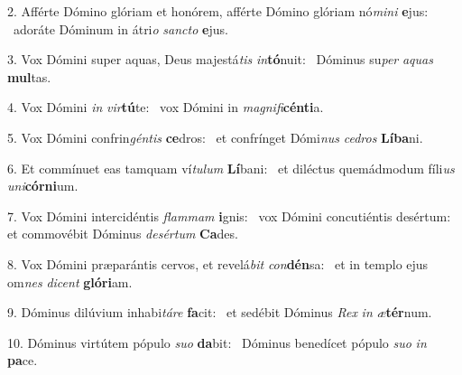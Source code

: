 2. Afférte Dómino glóriam et honórem, afférte Dómino glóriam nó\textit{mi}\textit{ni} \textbf{e}jus: \ast\  adoráte Dóminum in átri\textit{o} \textit{sanc}\textit{to} \textbf{e}jus.\

3. Vox Dómini super aquas, Deus majestá\textit{tis} \textit{in}\textbf{tó}nuit: \ast\  Dóminus su\textit{per} \textit{a}\textit{quas} \textbf{mul}tas.\

4. Vox Dómini \textit{in} \textit{vir}\textbf{tú}te: \ast\  vox Dómini in \textit{ma}\textit{gni}\textit{fi}\textbf{cén}\textbf{ti}a.\

5. Vox Dómini confrin\textit{gén}\textit{tis} \textbf{ce}dros: \ast\  et confrínget Dómi\textit{nus} \textit{ce}\textit{dros} \textbf{Lí}\textbf{ba}ni.\

6. Et commínuet eas tamquam ví\textit{tu}\textit{lum} \textbf{Lí}bani: \ast\  et diléctus quemádmodum fíli\textit{us} \textit{u}\textit{ni}\textbf{cór}\textbf{ni}um.\

7. Vox Dómini intercidéntis \textit{flam}\textit{mam} \textbf{i}gnis: \ast\  vox Dómini concutiéntis desértum: et commovébit Dóminus \textit{de}\textit{sér}\textit{tum} \textbf{Ca}des.\

8. Vox Dómini præparántis cervos, et revelá\textit{bit} \textit{con}\textbf{dén}sa: \ast\  et in templo ejus om\textit{nes} \textit{di}\textit{cent} \textbf{gló}\textbf{ri}am.\

9. Dóminus dilúvium inhabi\textit{tá}\textit{re} \textbf{fa}cit: \ast\  et sedébit Dóminus \textit{Rex} \textit{in} \textit{æ}\textbf{tér}num.\

10. Dóminus virtútem pópulo \textit{su}\textit{o} \textbf{da}bit: \ast\  Dóminus benedícet pópulo \textit{su}\textit{o} \textit{in} \textbf{pa}ce.\

